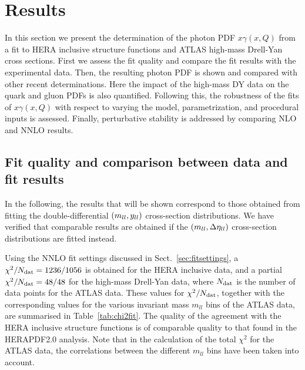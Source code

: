 \section{Results}
\label{sec:results}

In this section we present the
determination of the photon PDF $x\gamma(x,Q)$ from a fit to 
HERA inclusive structure functions and ATLAS high-mass Drell-Yan cross sections.
%
First we assess the fit quality and compare the fit results
with the experimental data.
%
Then, the resulting photon PDF is shown and compared with other
recent determinations.
%
Here the impact of the high-mass DY data on
the quark and gluon PDFs is also quantified.
%
Following this,
the robustness of the fits of $x\gamma(x,Q)$
with respect to varying the model, parametrization, and procedural
inputs is assessed.
%
Finally, perturbative stability is addressed by comparing NLO and
NNLO results.

\subsection{Fit quality and comparison between data and fit results}

In the following, the results that will be shown
correspond to those obtained from fitting the
double-differential $\left( m_{ll},y_{ll}\right)$ cross-section distributions.
%
We have verified that comparable results are obtained if the
$\left( m_{ll},\Delta\eta_{ll}\right)$ cross-section distributions are fitted instead.

Using the NNLO fit settings discussed in Sect.~\ref{sec:fitsettings},
a $\chi^{2}/N_{\rm dat} = 1236/1056$ is obtained
for the HERA inclusive data, and a partial
$\chi^2/N_{\rm dat} = 48/48$ for the high-mass Drell-Yan data,
where $N_{\rm dat}$  is the number of data points for the ATLAS data.
%
These values for  $\chi^{2}/N_{\rm dat}$, together
with the corresponding values for the various
invariant mass $m_{ll}$ bins of the ATLAS  data,
are summarised in
Table~\ref{tab:chi2fit}.
%
The quality of the agreement with the HERA inclusive structure
functions is of comparable quality to that found in the HERAPDF2.0 analysis.
%
Note that in the calculation of the total $\chi^2$ for the
ATLAS data, the correlations between the
different $m_{ll}$ bins have been taken into account.

